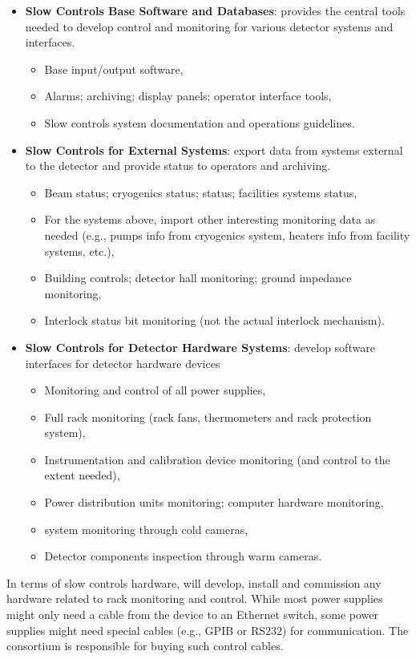\begin{itemize}
\item {\bf Slow Controls Base Software and Databases}: provides the central tools needed to develop control and monitoring for various detector systems and interfaces.
  \begin{itemize}
  \item Base input/output software,
  \item Alarms; archiving; display panels; operator interface tools,
  \item Slow controls system documentation and operations guidelines.
  \end{itemize}
\item {\bf Slow Controls for External Systems}: export data from systems external to the detector and provide status to operators and archiving.
  \begin{itemize}
  \item Beam status; cryogenics status;  status; facilities systems status,
  \item For the systems above, import other interesting monitoring data as needed (e.g., pumps info from cryogenics system, heaters info from facility systems, etc.),
  \item Building controls; detector hall monitoring; ground impedance monitoring,
  \item Interlock status bit monitoring (not the actual interlock mechanism).
  \end{itemize}
\item {\bf Slow Controls for Detector Hardware Systems}: develop software interfaces for detector hardware devices
  \begin{itemize}
  \item Monitoring and control of all power supplies,
  \item Full rack monitoring (rack fans, thermometers and rack protection system),
  \item Instrumentation and calibration device monitoring (and control to the extent needed),
  \item Power distribution units monitoring; computer hardware monitoring,
  \item {} system monitoring through cold cameras,
  \item Detector components inspection through warm cameras.
  \end{itemize}
\end{itemize}

In terms of slow controls hardware,  will develop, install and
commission any hardware related to rack monitoring and control. While
most power supplies might only need a cable from the device to an
Ethernet switch, some power supplies might need special cables (e.g., 
GPIB or RS232) for communication. The  consortium is responsible for
buying such control cables.

